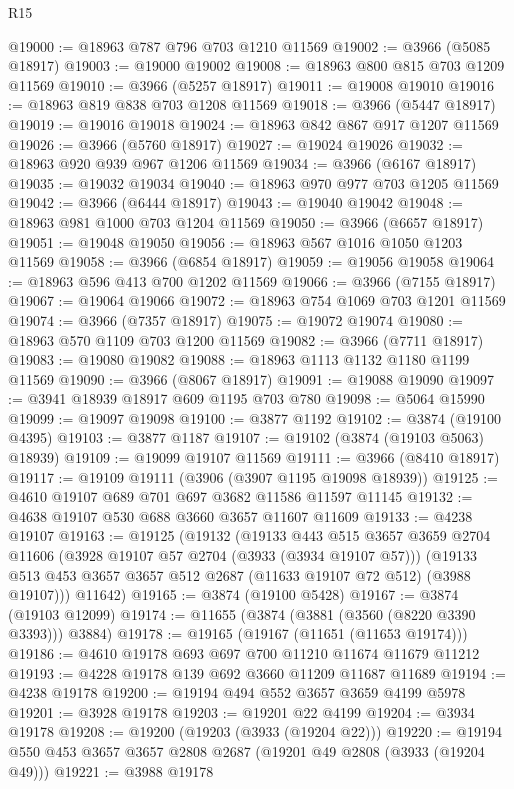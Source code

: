 \begin{lexlean}{R15}
\begin{coremodule}
@19000 := @18963 @787 @796 @703 @1210 @11569
@19002 := @3966 (@5085 @18917)
@19003 := @19000 @19002
@19008 := @18963 @800 @815 @703 @1209 @11569
@19010 := @3966 (@5257 @18917)
@19011 := @19008 @19010
@19016 := @18963 @819 @838 @703 @1208 @11569
@19018 := @3966 (@5447 @18917)
@19019 := @19016 @19018
@19024 := @18963 @842 @867 @917 @1207 @11569
@19026 := @3966 (@5760 @18917)
@19027 := @19024 @19026
@19032 := @18963 @920 @939 @967 @1206 @11569
@19034 := @3966 (@6167 @18917)
@19035 := @19032 @19034
@19040 := @18963 @970 @977 @703 @1205 @11569
@19042 := @3966 (@6444 @18917)
@19043 := @19040 @19042
@19048 := @18963 @981 @1000 @703 @1204 @11569
@19050 := @3966 (@6657 @18917)
@19051 := @19048 @19050
@19056 := @18963 @567 @1016 @1050 @1203 @11569
@19058 := @3966 (@6854 @18917)
@19059 := @19056 @19058
@19064 := @18963 @596 @413 @700 @1202 @11569
@19066 := @3966 (@7155 @18917)
@19067 := @19064 @19066
@19072 := @18963 @754 @1069 @703 @1201 @11569
@19074 := @3966 (@7357 @18917)
@19075 := @19072 @19074
@19080 := @18963 @570 @1109 @703 @1200 @11569
@19082 := @3966 (@7711 @18917)
@19083 := @19080 @19082
@19088 := @18963 @1113 @1132 @1180 @1199 @11569
@19090 := @3966 (@8067 @18917)
@19091 := @19088 @19090
@19097 := @3941 @18939 @18917 @609 @1195 @703 @780
@19098 := @5064 @15990
@19099 := @19097 @19098
@19100 := @3877 @1192
@19102 := @3874 (@19100 @4395)
@19103 := @3877 @1187
@19107 := @19102 (@3874 (@19103 @5063) @18939)
@19109 := @19099 @19107 @11569
@19111 := @3966 (@8410 @18917)
@19117 := @19109 @19111 (@3906 (@3907 @1195 @19098 @18939))
@19125 := @4610 @19107 @689 @701 @697 @3682 @11586 @11597 @11145
@19132 := @4638 @19107 @530 @688 @3660 @3657 @11607 @11609
@19133 := @4238 @19107
@19163 := @19125
    (@19132
      (@19133
        @443
        @515
        @3657
        @3659
        @2704
        @11606
        (@3928 @19107 @57 @2704 (@3933 (@3934 @19107 @57)))
        (@19133 @513 @453 @3657 @3657 @512 @2687 (@11633 @19107 @72 @512) (@3988 @19107)))
      @11642)
@19165 := @3874 (@19100 @5428)
@19167 := @3874 (@19103 @12099)
@19174 := @11655 (@3874 (@3881 (@3560 (@8220 @3390 @3393))) @3884)
@19178 := @19165 (@19167 (@11651 (@11653 @19174)))
@19186 := @4610 @19178 @693 @697 @700 @11210 @11674 @11679 @11212
@19193 := @4228 @19178 @139 @692 @3660 @11209 @11687 @11689
@19194 := @4238 @19178
@19200 := @19194 @494 @552 @3657 @3659 @4199 @5978
@19201 := @3928 @19178
@19203 := @19201 @22 @4199
@19204 := @3934 @19178
@19208 := @19200 (@19203 (@3933 (@19204 @22)))
@19220 := @19194 @550 @453 @3657 @3657 @2808 @2687 (@19201 @49 @2808 (@3933 (@19204 @49)))
@19221 := @3988 @19178

\end{coremodule}
\end{lexlean}
